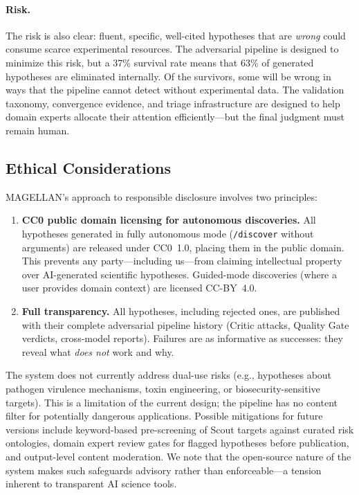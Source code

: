 \paragraph{Risk.} The risk is also clear: fluent, specific, well-cited hypotheses that are \emph{wrong} could consume scarce experimental resources. The adversarial pipeline is designed to minimize this risk, but a 37\% survival rate means that 63\% of generated hypotheses are eliminated internally. Of the survivors, some will be wrong in ways that the pipeline cannot detect without experimental data. The validation taxonomy, convergence evidence, and triage infrastructure are designed to help domain experts allocate their attention efficiently---but the final judgment must remain human.

\subsection{Ethical Considerations}

MAGELLAN's approach to responsible disclosure involves two principles:

\begin{enumerate}
    \item \textbf{CC0 public domain licensing for autonomous discoveries.} All hypotheses generated in fully autonomous mode (\texttt{/discover} without arguments) are released under CC0~1.0, placing them in the public domain. This prevents any party---including us---from claiming intellectual property over AI-generated scientific hypotheses. Guided-mode discoveries (where a user provides domain context) are licensed CC-BY~4.0.
    \item \textbf{Full transparency.} All hypotheses, including rejected ones, are published with their complete adversarial pipeline history (Critic attacks, Quality Gate verdicts, cross-model reports). Failures are as informative as successes: they reveal what \emph{does not} work and why.
\end{enumerate}

The system does not currently address dual-use risks (e.g., hypotheses about pathogen virulence mechanisms, toxin engineering, or biosecurity-sensitive targets). This is a limitation of the current design; the pipeline has no content filter for potentially dangerous applications. Possible mitigations for future versions include keyword-based pre-screening of Scout targets against curated risk ontologies, domain expert review gates for flagged hypotheses before publication, and output-level content moderation. We note that the open-source nature of the system makes such safeguards advisory rather than enforceable---a tension inherent to transparent AI science tools.

